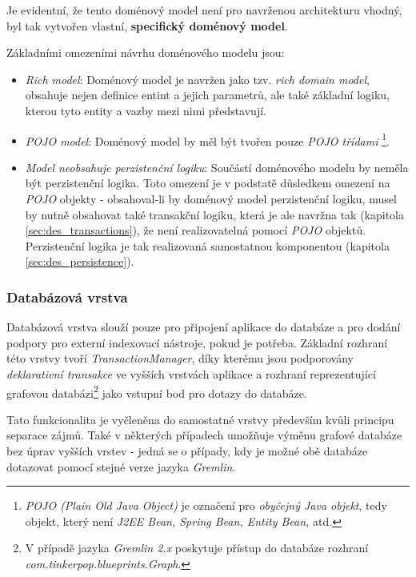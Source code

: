 Je evidentní, že tento doménový model není pro navrženou architekturu vhodný, byl tak vytvořen vlastní, \textbf{specifický doménový model}.

Základními omezeními návrhu doménového modelu jsou:
\begin{itemize}
   \item{\textit{Rich model}}: Doménový model je navržen jako tzv. \textit{rich domain model}, obsahuje nejen definice entint a jejich parametrů, ale také základní logiku, kterou tyto entity a vazby mezi nimi představují.
   \item{\textit{POJO model}}: Doménový model by měl být tvořen pouze \textit{POJO třídami} \footnote{\textit{POJO (Plain Old Java Object)} je označení pro \textit{obyčejný Java objekt}, tedy objekt, který není \textit{J2EE Bean, Spring Bean, Entity Bean,}  atd.}.
   \item{\textit{Model neobsahuje perzistenční logiku}}: Součástí doménového modelu by neměla být perzistenční logika. Toto omezení je v podstatě důsledkem omezení na \textit{POJO} objekty - obsahoval-li by doménový model perzistenční logiku, musel by nutně obsahovat také transakční logiku, která je ale navržna tak (kapitola \ref{sec:des_transactions}), že není realizovatelná pomocí \textit{POJO} objektů. Perzistenční logika je tak realizovaná samostatnou komponentou (kapitola \ref{sec:des_persistence}).
\end{itemize}

\subsubsection{Databázová vrstva}
\label{sec:des_database}
Databázová vrstva slouží pouze pro připojení aplikace do databáze a pro dodání podpory pro externí indexovací nástroje, pokud je potřeba. Základní rozhraní této vrstvy tvoří \textit{TransactionManager}, díky kterému jsou podporovány \textit{deklarativní transakce} ve vyšších vrstvách aplikace a rozhraní reprezentující grafovou databázi\footnote{V případě jazyka \textit{Gremlin 2.x} poskytuje přístup do databáze rozhraní \textit{com.tinkerpop.blueprints.Graph}.} jako vstupní bod pro dotazy do databáze.

Tato funkcionalita je vyčleněna do samostatné vrstvy především kvůli principu separace zájmů. Také v některých případech umožňuje výměnu grafové databáze bez úprav vyšších vrstev - jedná se o případy, kdy je možné obě databáze dotazovat pomocí stejné verze jazyka \textit{Gremlin}.

